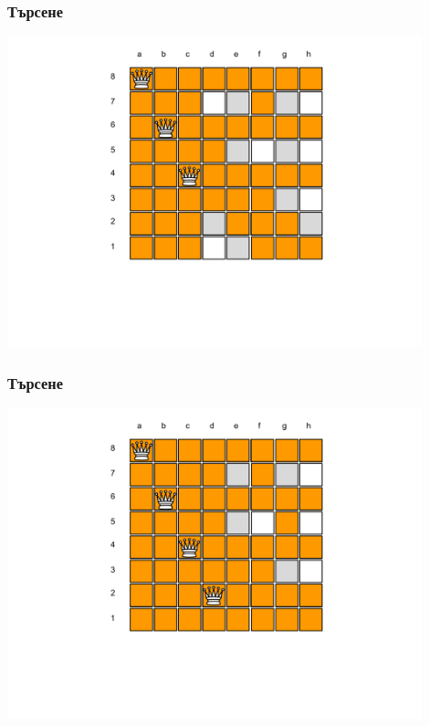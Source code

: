 \documentclass{beamer}
\begin{document}
\begin{frame}[fragile]
\frametitle{Търсене}
\begin{center}
\includegraphics[width=12cm]{images/cb_03}
\end{center}
\end{frame}


\begin{frame}[fragile]
\frametitle{Търсене}
\begin{center}
\includegraphics[width=12cm]{images/cb_04}
\end{center}
\end{frame}
\end{document}
